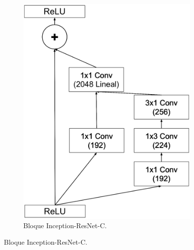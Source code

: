 \begin{figure}
    \vspace{1cm}
    \begin{subfigure}[t]{.45\textwidth}
      \centering
      \includegraphics[width=.7\linewidth]{Images/Inception-ResNet-C.png}
      \caption{Bloque Inception-ResNet-C.}
      \label{fig:Inception-ResNet-C}
    \end{subfigure}
    

\end{figure}
